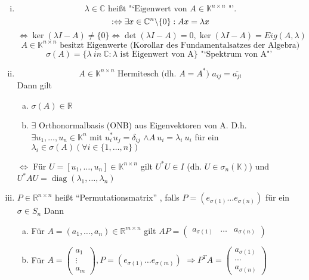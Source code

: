\documentclass[a4paper]{scrartcl}
\newcommand{\diag}{\mathop{\mathrm{diag}}}
\begin{document}
\begin{enumerate}[(i)]
\item
\[
\lambda \in \mathbb{C}\text{ heißt "`Eigenwert von } A \in 
\mathbb{K}^{n \times n} \text{ "'.} \]
\[
: \Leftrightarrow \exists x \in \mathbb{C}^n \backslash \{0\}: Ax = \lambda x \\
\]\[
\Leftrightarrow \ker (\lambda I -A) \neq \{0\} \Leftrightarrow 
\det (\lambda I -A) =0, \ker (\lambda I-A) = Eig (A, \lambda)
\]\[
A \in \mathbb{K}^{n \times n} \text{ besitzt Eigenwerte (Korollar des 
Fundamentalsatzes der Algebra)}
\]\[
\sigma (A) = \{ \lambda \ in~ \mathbb{C}: \lambda \text{ ist Eigenwert 
von A}\} \text{ "`Spektrum von A"' }
\]
\item
\[
A \in \mathbb{K}^{n \times n} \text{ Hermitesch (dh. } A = A^\ast \text{) } a_{ij} = \overline{a_{ji}}
\]
Dann gilt 
\begin{enumerate}[(a)]
\item
$ \sigma(A) \in \mathbb{R}$
\item
$\exists$ Orthonormalbasis (ONB) aus Eigenvektoren von A. D.h. $\exists u_1, \dots, u_n \in \mathbb{K}^n \text{ mit } u_i^\ast u_j = \delta_{ij}$
$\land A~u_i = \lambda_i~u_i$ für ein $\lambda_i \in \sigma(A) 
(\forall i \in \{1, \dots, n\})$  
\end{enumerate}
$\Leftrightarrow$ Für $U = [u_1, \dots, u_n] \in \mathbb{K}^{n\times n}$ gilt $U^\ast U \in I$
(dh. $U \in \sigma_n(\mathbb{K})$) und 
$U^\ast AU = \diag(\lambda_1, \dots, \lambda_n)$  

\item
	$P \in \mathbb{R}^{n \times n}$ heißt "`Permutationsmatrix"' , falls $P=(e_{\sigma(1)} \dots e_{\sigma(n)})$ für ein $\sigma \in S_n$
	Dann 
	\begin{enumerate}[(a)]
	\item Für $A = (a_1, \dots, a_n) \in \mathbb{R}^{m \times n}$ gilt
	$AP = \begin{pmatrix} a_{\sigma(1)} & \dots & a_{\sigma(n)}\end{pmatrix}$
	\item
	Für $A = \begin{pmatrix} a_1 \\ \vdots \\ a_m \end{pmatrix}, P = (e_{\sigma(1)} \dots e_{\sigma(m)})$
	$\Rightarrow P^T A = \begin{pmatrix} a_{\sigma(1)} \\ \cdots \\ a_{\sigma(n)}  \end{pmatrix}$
\end{enumerate}
\end{enumerate}
\end{document}
